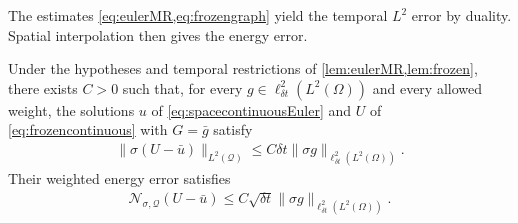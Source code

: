 \documentclass[print,wide,eng]{draft}
\begin{document}
The estimates \cref{eq:eulerMR,eq:frozengraph} yield the temporal $L^2$ error by duality. Spatial interpolation then gives the energy error.
%
\begin{theorem}\label{thm:timeerror}
Under the hypotheses and temporal restrictions of \cref{lem:eulerMR,lem:frozen}, there exists $C>0$ such that, for every $g\in\ell_{\delta t}^2(L^2(\Omega))$ and every allowed weight, the solutions $u$ of \cref{eq:spacecontinuousEuler} and $U$ of \cref{eq:frozencontinuous} with $G=\bar g$ satisfy
%
\begin{align}\label{eq:temporal-errors}
\|\sigma(U-\bar u)\|_{L^2(\mathcal Q)}\leq C{\delta t}\|\sigma g\|_{\ell_{\delta t}^2(L^2(\Omega))}.
\end{align}
%
Their weighted energy error satisfies
%
\begin{align}\label{eq:temporal-energy-error}
\mathcal{N}_{\sigma,\mathcal Q}(U-\bar u)\leq C\sqrt{{\delta t}}\|\sigma g\|_{\ell_{\delta t}^2(L^2(\Omega))}.
\end{align}
%
\end{theorem}
%
\end{document}
